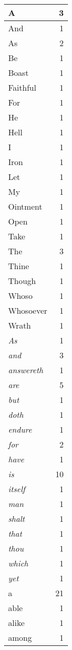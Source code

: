 \begin{center}
\begin{longtable}{l|r}
A & 3\\ \hline 
And & 1\\ \hline 
As & 2\\ \hline 
Be & 1\\ \hline 
Boast & 1\\ \hline 
Faithful & 1\\ \hline 
For & 1\\ \hline 
He & 1\\ \hline 
Hell & 1\\ \hline 
I & 1\\ \hline 
Iron & 1\\ \hline 
Let & 1\\ \hline 
My & 1\\ \hline 
Ointment & 1\\ \hline 
Open & 1\\ \hline 
Take & 1\\ \hline 
The & 3\\ \hline 
Thine & 1\\ \hline 
Though & 1\\ \hline 
Whoso & 1\\ \hline 
Whosoever & 1\\ \hline 
Wrath & 1\\ \hline 
\emph{As} & 1\\ \hline 
\emph{and} & 3\\ \hline 
\emph{answereth} & 1\\ \hline 
\emph{are} & 5\\ \hline 
\emph{but} & 1\\ \hline 
\emph{doth} & 1\\ \hline 
\emph{endure} & 1\\ \hline 
\emph{for} & 2\\ \hline 
\emph{have} & 1\\ \hline 
\emph{is} & 10\\ \hline 
\emph{itself} & 1\\ \hline 
\emph{man} & 1\\ \hline 
\emph{shalt} & 1\\ \hline 
\emph{that} & 1\\ \hline 
\emph{thou} & 1\\ \hline 
\emph{which} & 1\\ \hline 
\emph{yet} & 1\\ \hline 
a & 21\\ \hline 
able & 1\\ \hline 
alike & 1\\ \hline 
among & 1\\ \hline 

\end{longtable}
\end{center}

